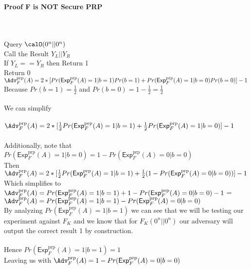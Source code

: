 \documentclass[11pt]{article}
\newcommand{\ExpPRP}[2]{\mathsf{Exp}^{\mathrm{prp}}_{#1}{(#2)}}
\newcommand{\AdvPRP}[2]{\Adv^{\mathrm{prp}}_{#1}(#2)}
\begin{document}
\paragraph{Proof F is NOT Secure PRP}\quad
\\


\\
Query $\calO(0^n || 0^n)$\\
Call the Result $Y_L || Y_R$\\
If $Y_L == Y_R$ then Return 1\\
Return 0\\

$\AdvPRP{F}{A} = 2*[Pr(\ExpPRP{F}{A} = 1 | b = 1)Pr(b = 1) +  Pr(\ExpPRP{F}{A} = 1 | b = 0)Pr(b = 0)] - 1$\\

Because $Pr(b = 1) = \frac{1}{2}$ and $Pr(b = 0) = 1 - \frac{1}{2} = \frac{1}{2}$ \\
\\
We can simplify \\
\\
$\AdvPRP{F}{A} = 2*[\frac{1}{2}Pr(\ExpPRP{F}{A} = 1 | b = 1) +  \frac{1}{2}Pr(\ExpPRP{F}{A} = 1 | b = 0)] - 1$\\
\\
Additionally, note that $Pr(\ExpPRP{F}{A} = 1 | b = 0) = 1 - Pr(\ExpPRP{F}{A} = 0 | b = 0)$\\


Then $\AdvPRP{F}{A} = 2*[\frac{1}{2}Pr(\ExpPRP{F}{A} = 1 | b = 1) +  \frac{1}{2}(1 - Pr(\ExpPRP{F}{A} = 0 | b = 0))] - 1$\\

Which simplifies to $\AdvPRP{F}{A} = Pr(\ExpPRP{F}{A} = 1 | b = 1) +  1 - Pr(\ExpPRP{F}{A} = 0 | b = 0) - 1$ = \\

$\AdvPRP{F}{A} = Pr(\ExpPRP{F}{A} = 1 | b = 1) - Pr(\ExpPRP{F}{A} = 0 | b = 0)$\\

By analyzing $Pr(\ExpPRP{F}{A} = 1 | b = 1)$ we can see that we will be testing our experiment against $F_K$ and we know that for $F_K(0^n|| 0^n)$ our adversary will output the correct result 1 by construction.\\ 
\\
Hence $Pr(\ExpPRP{F}{A} = 1 | b = 1) = 1$\\

Leaving us with $\AdvPRP{F}{A} = 1 - Pr(\ExpPRP{F}{A} = 0 | b = 0)$\\
\end{document}
